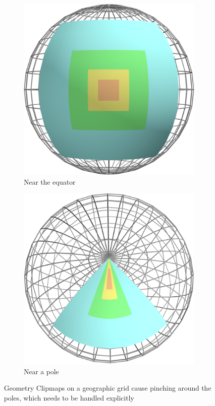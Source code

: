 \begin{figure}[htbp]
    \centering
    \begin{subfigure}[bt]{0.25\textwidth}
        \includegraphics[width=\textwidth]{figures/geometryclipmap/clipmap1.png}
        \caption{Near the equator}
    \end{subfigure}
    \quad
    \begin{subfigure}[bt]{0.25\textwidth}
        \includegraphics[width=\textwidth]{figures/geometryclipmap/clipmap2.png}
        \caption{Near a pole}
    \end{subfigure}
    \caption{Geometry Clipmaps on a geographic grid cause pinching around the poles, which needs to be handled explicitly}
    \label{fig:mipclip}
\end{figure}

